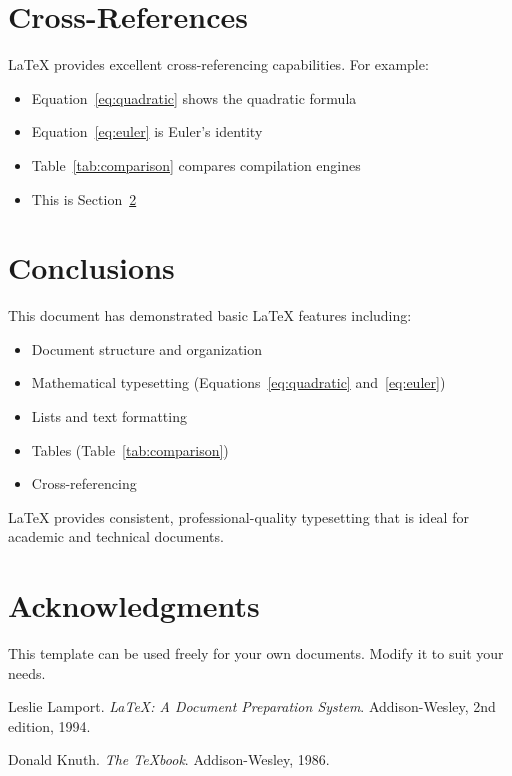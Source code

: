\documentclass[11pt,a4paper]{article}
\begin{document}
\section{Cross-References}

LaTeX provides excellent cross-referencing capabilities. For example:
\begin{itemize}
    \item Equation~\ref{eq:quadratic} shows the quadratic formula
    \item Equation~\ref{eq:euler} is Euler's identity
    \item Table~\ref{tab:comparison} compares compilation engines
    \item This is Section~\ref{sec:conclusions}
\end{itemize}

\section{Conclusions}
\label{sec:conclusions}

This document has demonstrated basic LaTeX features including:
\begin{itemize}
    \item Document structure and organization
    \item Mathematical typesetting (Equations~\ref{eq:quadratic} and~\ref{eq:euler})
    \item Lists and text formatting
    \item Tables (Table~\ref{tab:comparison})
    \item Cross-referencing
\end{itemize}

LaTeX provides consistent, professional-quality typesetting that is ideal for academic and technical documents.

\section*{Acknowledgments}

This template can be used freely for your own documents. Modify it to suit your needs.

\begin{thebibliography}{9}

Leslie Lamport.
\textit{LaTeX: A Document Preparation System}.
Addison-Wesley, 2nd edition, 1994.

Donald Knuth.
\textit{The TeXbook}.
Addison-Wesley, 1986.

\end{thebibliography}
\end{document}
